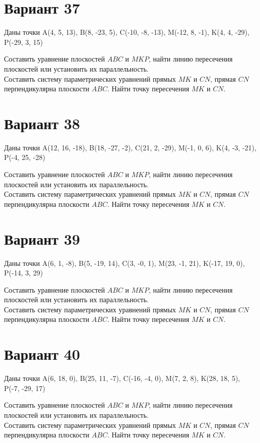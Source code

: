 \documentclass[11pt]{article}
\begin{document}
\section*{Вариант 37}
Даны точки A(4, 5, 13), B(8, -23, 5), C(-10, -8, -13), M(-12, 8, -1), K(4, 4, -29), P(-29, 3, 15)

Составить уравнение плоскостей $ABC$ и $MKP$, найти линию пересечения плоскостей или установить их параллельность.\\
Составить систему параметрических уравнений прямых $MK$ и $CN$, прямая $CN$ перпендикулярна плоскости $ABC$. Найти точку пересечения $MK$ и $CN$.

\section*{Вариант 38}
Даны точки A(12, 16, -18), B(18, -27, -2), C(21, 2, -29), M(-1, 0, 6), K(4, -3, -21), P(-4, 25, -28)

Составить уравнение плоскостей $ABC$ и $MKP$, найти линию пересечения плоскостей или установить их параллельность.\\
Составить систему параметрических уравнений прямых $MK$ и $CN$, прямая $CN$ перпендикулярна плоскости $ABC$. Найти точку пересечения $MK$ и $CN$.

\section*{Вариант 39}
Даны точки A(6, 1, -8), B(5, -19, 14), C(3, -0, 1), M(23, -1, 21), K(-17, 19, 0), P(-14, 3, 29)

Составить уравнение плоскостей $ABC$ и $MKP$, найти линию пересечения плоскостей или установить их параллельность.\\
Составить систему параметрических уравнений прямых $MK$ и $CN$, прямая $CN$ перпендикулярна плоскости $ABC$. Найти точку пересечения $MK$ и $CN$.

\section*{Вариант 40}
Даны точки A(6, 18, 0), B(25, 11, -7), C(-16, -4, 0), M(7, 2, 8), K(28, 18, 5), P(-7, -29, 17)

Составить уравнение плоскостей $ABC$ и $MKP$, найти линию пересечения плоскостей или установить их параллельность.\\
Составить систему параметрических уравнений прямых $MK$ и $CN$, прямая $CN$ перпендикулярна плоскости $ABC$. Найти точку пересечения $MK$ и $CN$.
\end{document}
